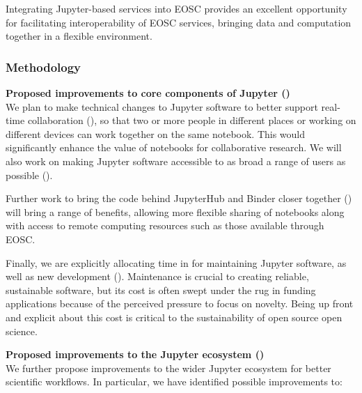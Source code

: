 Integrating Jupyter-based services into EOSC provides an excellent opportunity
for facilitating interoperability of EOSC services,
bringing data and computation together in a flexible environment.

\subsubsection{Methodology}\label{sec:methodology}


\textbf{Proposed improvements to core components of Jupyter ()}\\
We plan to make technical changes to Jupyter software to better support
real-time collaboration (),
so that two or more people in different places or working on different
devices can work together
on the same notebook. This would significantly enhance the value of
notebooks for collaborative research.
We will also work on making Jupyter software accessible to as broad a
range of users as possible ().

Further work to bring the code behind JupyterHub and Binder closer together
() will bring a range of benefits, allowing more
flexible sharing of notebooks along with access to remote computing resources
such as those available through EOSC.

Finally, we are explicitly allocating time in  for maintaining
Jupyter software, as well as new development ().
Maintenance is crucial to creating reliable, sustainable software,
but its cost is often swept under the rug in funding applications
because of the perceived pressure to focus on novelty.
Being up front and explicit about this cost is critical to the sustainability
of open source open science.

\medskip
\noindent\textbf{Proposed improvements to the Jupyter ecosystem ()}\\
We further propose improvements to the wider Jupyter ecosystem for
better scientific workflows. In particular, we have identified
possible improvements to:

